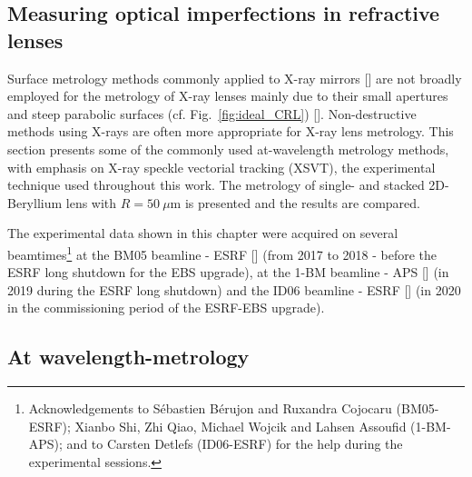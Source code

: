 \begin{refsection}
\chapter{Measuring optical imperfections in refractive lenses}\label{sec:measuring}

Surface metrology methods commonly applied to X-ray mirrors [\cite{Alcock2016, Vivo2019}] are not broadly employed for the metrology of X-ray lenses mainly due to their small apertures and steep parabolic surfaces (cf. Fig.~\ref{fig:ideal_CRL}) [\cite{Lyatun2015}]. Non-destructive methods using X-rays are often more appropriate for X-ray lens metrology. This section presents some of the commonly used at-wavelength metrology methods, with emphasis on X-ray speckle vectorial tracking (XSVT), the experimental technique used throughout this work. The metrology of single- and stacked 2D-Beryllium lens with $R=50~\mu$m is presented and the results are compared. %

The experimental data shown in this chapter were acquired on several beamtimes\footnote{Acknowledgements to Sébastien Bérujon and Ruxandra Cojocaru (BM05-ESRF); Xianbo Shi, Zhi Qiao, Michael Wojcik and Lahsen Assoufid (1-BM-APS); and to Carsten Detlefs (ID06-ESRF) for the help during the experimental sessions.} at the BM05 beamline - ESRF [\cite{Ziegler2004}] (from 2017 to 2018 - before the ESRF long shutdown for the EBS upgrade), at the 1-BM beamline - APS [\cite{Macrander2016}] (in 2019 during the ESRF long shutdown) and the ID06 beamline - ESRF [\cite{Kutsal_2019}] (in 2020 in the commissioning period of the ESRF-EBS upgrade).


\section{At wavelength-metrology}\label{sec:at_wavelength}


\end{refsection}
